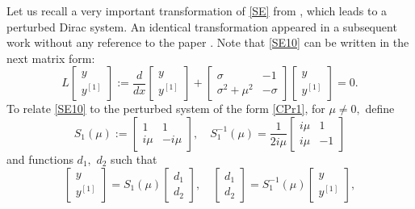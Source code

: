 \documentclass[11pt]{amsart}
\theoremstyle{plain}
\theoremstyle{definition}
\theoremstyle{remark}
\numberwithin{equation}{section}
\begin{document}
Let us recall a very important transformation of \eqref{SE} from \cite[Section 4]{GRZ1}, which leads to
a perturbed Dirac system. An identical transformation appeared in a subsequent work \cite[section 6]{SSad3}
without any reference to the paper \cite{GRZ1}.
Note that \eqref{SE10} can be written in the next matrix form:
\begin{equation}\label{Znew}
L\left[\begin{array} {c}
y \\
y^{[1]}\end{array}
\right]:=
\frac{d}{dx}
\left[\begin{array} {c}
y \\
y^{[1]}\end{array}
\right]+
\left[\begin{array}{cc}
\sigma & -1\\
\sigma^2+\mu^2 & -\sigma\end{array}\right]\left[\begin{array} {c}
y \\
y^{[1]}\end{array}
\right]=0.
\end{equation}
To relate   \eqref{SE10}
to the perturbed system of the form \eqref{CPr1},
for $\mu\not=0,$ define
\[
S_1(\mu):=\left[\begin{array}{cc}
1 &  1\\
i\mu & -i\mu
\end{array}\right],\quad
S_1^{-1}(\mu)=
\frac{1}{2i\mu}\left[
\begin{array}{cc}
i\mu & 1\\
i\mu & -1
\end{array}\right]
\]
and functions $d_1,$  $d_2$ such that
\begin{equation}\label{Change1}
\left[\begin{array} {c}
y \\
y^{[1]}\end{array}
\right]=S_1(\mu)
\left[\begin{array} {c}
d_1 \\
d_2\end{array}
\right],\quad
\left[\begin{array} {c}
d_1 \\
d_2\end{array}
\right]=S_1^{-1}(\mu)
\left[\begin{array} {c}
y \\
y^{[1]}\end{array}
\right],
\end{equation}
\end{document}
